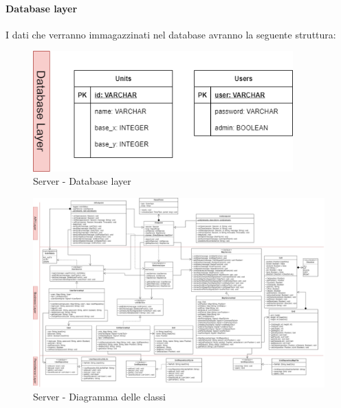 \paragraph{Database layer}
I dati che verranno immagazzinati nel database avranno la seguente struttura:
\begin{figure}[H]
	\centering
	\includegraphics[width=10cm]{img/server_dblayer.png}
	\caption{Server - Database layer}
\end{figure}

\begin{landscape}
	\begin{figure}[h!]
		\includegraphics[width=24cm]{img/server_classi.png}
		\caption{Server - Diagramma delle classi}
	\end{figure}
\end{landscape}

